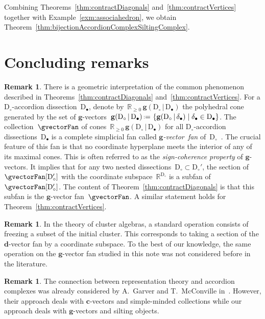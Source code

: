 \documentclass{compositio}
\theoremstyle{definition}
\newtheorem{remark}[theorem]{Remark}
\newcommand{\R}{\mathbb{R}} %
\renewcommand{\b}[1]{\mathbf{#1}} %
\newcommand{\set}[2]{\left\{ #1 \;\middle|\; #2 \right\}} %
\newcommand{\eqdef}{\mbox{\,\raisebox{0.2ex}{\scriptsize\ensuremath{\mathrm:}}\ensuremath{=}\,}} %
\newcommand{\darkblue}{\color{darkblue}} %
\newcommand{\defn}[1]{\textsl{\darkblue #1}} %
\newcommand{\dissection}{\mathrm{D}} %
\newcommand{\gvector}[2]{\mathbf{g}(#1 \,|\, #2)} %
\begin{document}
Combining Theorems~\ref{thm:contractDiagonals} and~\ref{thm:contractVertices} together with Example~\ref{exm:associahedron}, we obtain Theorem~\ref{thm:bijectionAccordionComplexSiltingComplex}.


\section{Concluding remarks}

\begin{remark}
There is a geometric interpretation of the common phenomenon described in Theorems~\ref{thm:contractDiagonals} and~\ref{thm:contractVertices}.
For a $\dissection_\circ$-accordion dissection~$\dissection_\bullet$, denote by~$\R_{\ge0}\,\gvector{\dissection_\circ}{\dissection_\bullet}$ the polyhedral cone generated by the set of $\b{g}$-vectors~$\gvector{\dissection_\circ}{\dissection_\bullet} \eqdef \set{\gvector{\dissection_\circ}{\delta_\bullet}}{\delta_\bullet \in \dissection_\bullet}$. The collection~$\gvectorFan$ of cones~$\R_{\ge0}\,\gvector{\dissection_\circ}{\dissection_\bullet}$ for all $\dissection_\circ$-accordion dissections~$\dissection_\bullet$ is a complete simplicial fan called \mbox{\defn{$\b{g}$-vector fan}} of~$\dissection_\circ$~\cite{MannevillePilaud-accordion}.
The crucial feature of this fan is that no coordinate hyperplane meets the interior of any of its maximal cones.
This is often referred to as the \defn{sign-coherence property} of $\b{g}$-vectors.
It implies that for any two nested dissections~$\dissection_\circ \subset \dissection_\circ'$, the section of~$\gvectorFan[\dissection_\circ']$ with the coordinate subspace~$\R^{\dissection_\circ}$ is a subfan of~$\gvectorFan[\dissection_\circ']$.
The content of Theorem~\ref{thm:contractDiagonals} is that this subfan is the $\b{g}$-vector fan~$\gvectorFan$.
A similar statement holds for Theorem~\ref{thm:contractVertices}.
\end{remark}

\begin{remark}
In the theory of cluster algebras, a standard operation consists of freezing a subset of the initial cluster.
This corresponds to taking a section of the $\b{d}$-vector fan by a coordinate subspace.
To the best of our knowledge, the same operation on the $\b{g}$-vector fan studied in this note was not considered before in the literature.
\end{remark}

\begin{remark}
The connection between representation theory and accordion complexes was already considered by A.~Garver and T.~McConville in~\cite[Sect.~8]{GarverMcConville}.
However, their approach deals with $\b{c}$-vectors and simple-minded collections while our approach deals with $\b{g}$-vectors and silting objects.
\end{remark}
\end{document}

